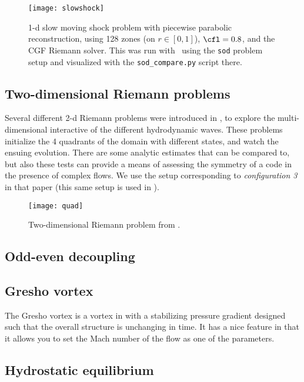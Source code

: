 \begin{figure}[t]
\centering
\texttt{[image: slowshock]}
\caption[1-d spherical Sedov problem]{\label{fig:Euler:slowshock:ppm} 1-d slow moving shock
  problem with
  piecewise parabolic reconstruction, using 128 zones (on $r \in
  [0,1]$), $\cfl = 0.8$, and the CGF Riemann solver.  This was run
  with \hydrooned\ using the {\tt sod} problem setup and visualized
  with the {\tt sod\_compare.py} script there.}
\end{figure}


\subsection{Two-dimensional Riemann problems}

Several different 2-d Riemann problems were introduced in
\cite{hydro_test_quad}, to explore the multi-dimensional
interactive of the different hydrodynamic waves.  These
problems initialize the 4 quadrants of the domain with different
states, and watch the ensuing evolution.  There are some
analytic estimates that can be compared to, but also these
tests can provide a means of assessing the symmetry of
a code in the presence of complex flows.  We use the setup
corresponding to {\em configuration 3} in that paper (this
same setup is used in \cite{leveque:1997}).

\begin{figure}[t]
\centering
\texttt{[image: quad]}
\caption{\label{fig:Euler:quad} Two-dimensional Riemann problem
from \cite{hydro_test_quad}.}
\end{figure}

\ifdefined \debugmode
\subsection{Odd-even decoupling}

\subsection{Gresho vortex}

The Gresho vortex is a vortex in with a stabilizing pressure gradient
designed such that the overall structure is unchanging in time.  It
has a nice feature in that it allows you to set the Mach number of
the flow as one of the parameters.


\subsection{Hydrostatic equilibrium}

